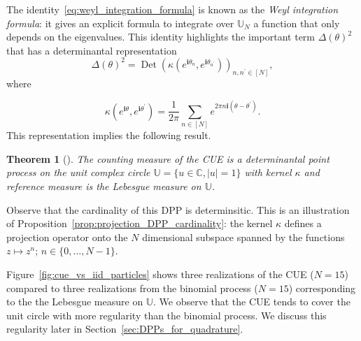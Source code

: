 \documentclass[twoside,11pt]{book}
\newtheorem{theorem}{Theorem}
\numberwithin{theorem}{chapter}
\numberwithin{definition}{chapter}
\numberwithin{proposition}{chapter}
\numberwithin{corollary}{chapter}
\numberwithin{example}{chapter}
\numberwithin{lemma}{chapter}
\numberwithin{assumption}{chapter}
\DeclareMathOperator{\Det}{Det}
\begin{document}
 


The identity~\eqref{eq:weyl_integration_formula} is known as the \emph{Weyl integration formula}: it gives an explicit formula to integrate  over $\mathbb{U}_N$ a function that only depends on the eigenvalues. This identity highlights the important term $\Delta(\theta)^{2}$ that has a determinantal representation
\begin{equation}
\Delta(\theta)^{2} = \Det (\kappa(e^{\mathbf{i}\theta_{n}},e^{\mathbf{i}\theta_{n^{'}}}))_{n,n^{'} \in [N]},
\end{equation}
where

\begin{equation}
\kappa(e^{\mathbf{i}\theta},e^{\mathbf{i}\theta^{'}}) = \frac{1}{2 \pi}\sum\limits_{n \in [N]} e^{2 \pi n \mathbf{i}(\theta-\theta^{'})}.
\end{equation}
This representation implies the following result.
\begin{theorem}[\cite{Dys62}]\label{thm:CUE_is_DPP}
The counting measure of the CUE is a determinantal point process on the unit complex circle $\mathbb{U} = \{ u \in \mathbb{C}, |u| =1 \}$ with kernel $\kappa$ and reference measure is the Lebesgue measure on $\mathbb{U}$.

\end{theorem}
Observe that the cardinality of this DPP is determinsitic. This is an illustration of Proposition~\ref{prop:projection_DPP_cardinality}: the kernel $\kappa$ defines a projection operator onto the $N$ dimensional subspace spanned by the functions $z \mapsto z^{n}$;  $n \in \{0, \dots, N-1 \}$.  

Figure~\ref{fig:cue_vs_iid_particles} shows three realizations of the CUE ($N = 15$) compared to three realizations from the binomial process ($N = 15$) corresponding to the the Lebesgue measure on $\mathbb{U}$. We observe that the CUE tends to cover the unit circle with more regularity than the binomial process. We discuss this regularity later in Section~\ref{sec:DPPs_for_quadrature}.



\end{document}
